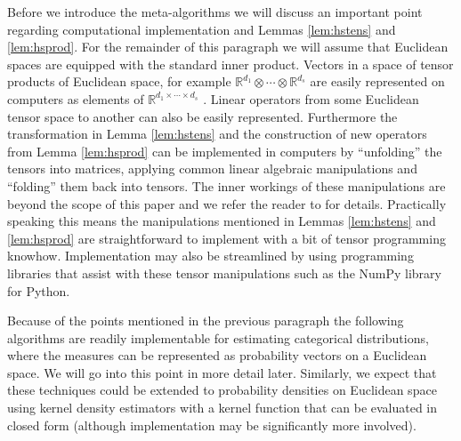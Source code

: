 \documentclass[aos,preprint]{imsart}
\def\rn{\mathbb{R}}
\theoremstyle{plain}
\theoremstyle{defintion}
\begin{document}
Before we introduce the meta-algorithms we will discuss an important point regarding computational implementation and Lemmas \ref{lem:hstens} and \ref{lem:hsprod}. For the remainder of this paragraph we will assume that Euclidean spaces are equipped with the standard inner product. Vectors in a space of tensor products of Euclidean space, for example $\rn^{d_1}\otimes \cdots \otimes \rn^{d_s}$ are easily represented on computers as elements of $\rn^{d_1\times \cdots \times d_s}$ \cite{symtensorrank}. Linear operators from some Euclidean tensor space to another can also be easily represented. Furthermore the transformation in Lemma \ref{lem:hstens} and the construction of new operators from Lemma \ref{lem:hsprod} can be implemented in computers by  ``unfolding'' the tensors into matrices, applying common linear algebraic manipulations and ``folding'' them back into tensors. The inner workings of these manipulations are beyond the scope of this paper and we refer the reader to \cite{golub1996} for details. Practically speaking this means the manipulations mentioned in Lemmas \ref{lem:hstens} and \ref{lem:hsprod} are straightforward to implement with a bit of tensor programming knowhow. Implementation may also be streamlined by using programming libraries that assist with these tensor manipulations such as the NumPy library for Python.

Because of the points mentioned in the previous paragraph the following algorithms are readily implementable for estimating categorical distributions, where the measures can be represented as probability vectors on a Euclidean space. We will go into this point in more detail later.  Similarly, we expect that these techniques could be extended to probability densities on Euclidean space using kernel density estimators with a kernel function that can be evaluated in closed form (although implementation may be significantly more involved).
\end{document}
